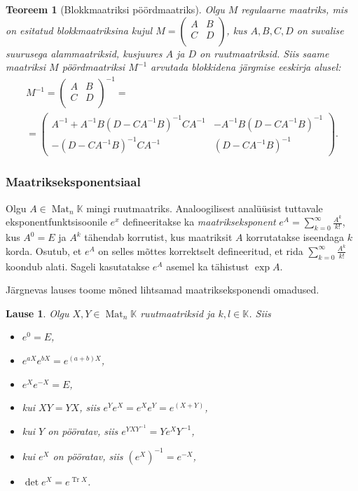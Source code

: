 \documentclass[12pt,a4paper,oneside]{article}
\theoremstyle{plain}
\newtheorem{teoreem}{Teoreem}[section]
\newtheorem{lause}{Lause}[section]
\theoremstyle{definition}
\numberwithin{equation}{section}
\def\K{{\mathbb K}}
\DeclareMathOperator{\Mat}{Mat}
\DeclareMathOperator{\Tr}{Tr}
\begin{document}
\begin{teoreem}[Blokkmaatriksi pöördmaatriks]
Olgu $M$ regulaarne maatriks, mis on esitatud blokkmaatriksina kujul 
$M = \begin{pmatrix} A & B \\ C & D \\ \end{pmatrix}$, kus $A, B, C, D$ 
on suvalise suurusega alammaatriksid, kusjuures $A$ ja $D$ on 
ruutmaatriksid. Siis saame maatriksi $M$ pöördmaatriksi $M^{-1}$ 
arvutada blokkidena järgmise eeskirja alusel:
\begin{align*}
M^{-1} = \begin{pmatrix}
A & B \\ C & D \\
\end{pmatrix}^{-1} = \qquad\qquad\qquad\qquad\qquad \\
= \begin{pmatrix}
A^{-1}+A^{-1}B\left(D-CA^{-1}B\right)^{-1}CA^{-1} & 
	-A^{-1}B\left(D-CA^{-1}B\right)^{-1} \\
-\left(D- CA^{-1}B\right)^{-1}CA^{-1} & \left(D-CA^{-1}B\right)^{-1}
\end{pmatrix}.
\end{align*}
\end{teoreem}

\subsubsection*{Maatrikseksponentsiaal}

Olgu $A \in \Mat_n\K$ mingi ruutmaatriks. Analoogilisest analüüsist 
tuttavale eksponentfunktsisoonile $e^x$ defineeritakse ka 
\emph{maatrikseksponent} $e^A = \sum_{k = 0}^{\infty} \frac{A^k}{k!}$, 
kus $A^0 = E$ ja $A^k$ tähendab korrutist, kus maatriksit $A$ 
korrutatakse iseendaga $k$ korda. Osutub, et $e^A$ on selles mõttes 
korrektselt defineeritud, et rida 
$\sum_{k = 0}^{\infty} \frac{A^k}{k!}$ koondub alati. 
Sageli kasutatakse $e^A$ asemel ka tähistust $\exp A$.

Järgnevas lauses toome mõned lihtsamad maatrikseksponendi omadused.
\begin{lause}
Olgu $X, Y \in \Mat_n \K$ ruutmaatriksid ja $k, l \in \K$. Siis
\begin{itemize}
\item $e^0 = E$,
\item $e^{aX}e^{bX} = e^{\left(a+b\right)X}$,
\item $e^{X} e^{-X} = E$,
\item kui $XY = YX$, siis $e^Y e^X = e^X e^Y = e^{\left(X + Y\right)}$,
\item kui $Y$ on pööratav, siis $e^{YXY^{-1}} = Ye^XY^{-1}$,
\item kui $e^X$ on pööratav, siis $\left(e^X\right)^{-1} = e^{-X}$,
\item $\det e^X = e^{\Tr X}$.
\end{itemize}
\end{lause}
\end{document}
